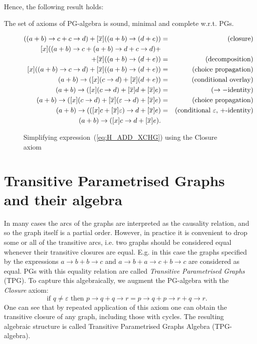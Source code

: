 Hence, the following result holds:
\begin{thm}
 The set of axioms of PG-algebra
is sound, minimal and complete w.r.t. PGs.
\end{thm}
\begin{figure}

\begin{eqnarray*}
[x]((a+b)\rightarrow c+c\rightarrow d)+[\overline{x}]((a+b)\rightarrow(d+e)) & = & (\textrm{closure)}\\
{}[x]((a+b)\rightarrow c+(a+b)\rightarrow d+c\rightarrow d)+\\+[\overline{x}]((a+b)\rightarrow(d+e)) & = & (\textrm{decomposition)}\\
{}[x]((a+b)\rightarrow c\rightarrow d)+[\overline{x}]((a+b)\rightarrow(d+e)) & = & (\textrm{choice propagation)}\\
(a+b)\rightarrow([x](c\rightarrow d)+[\overline{x}](d+e)) & = & (\textrm{conditional overlay)}\\
(a+b)\rightarrow([x](c\rightarrow d)+[\overline{x}]d+[\overline{x}]e) & = & (\rightarrow-\textrm{identity)}\\
(a+b)\rightarrow([x](c\rightarrow d)+[\overline{x}](\varepsilon\rightarrow d)+[\overline{x}]e) & = & (\textrm{choice propagation)}\\
(a+b)\rightarrow(([x]c+[\overline{x}]\varepsilon)\rightarrow d+[\overline{x}]e) & = & (\textrm{conditional \ensuremath{\varepsilon}, +-\textrm{identity)}}\\
(a+b)\rightarrow([x]c\rightarrow d+[\overline{x}]e).
\end{eqnarray*}


\caption{Simplifying expression~(\ref{eq:H_ADD_XCHG}) using the Closure axiom\label{fig:Simplifying-TPG-expressions}}
\end{figure}



\section{Transitive Parametrised Graphs and their algebra}

In many cases the arcs of the graphs are interpreted as the causality
relation, and so the graph itself is a partial order. However, in
practice it is convenient to drop some or all of the transitive arcs,
i.e. two graphs should be considered equal whenever their transitive
closures are equal. E.g. in this case the graphs specified by the
expressions $a\rightarrow b+b\rightarrow c$ and $a\rightarrow b+a\rightarrow c+b\rightarrow c$
are considered as equal. PGs with this equality relation are called
\emph{Transitive Parametrised Graphs} (TPG). To capture this algebraically,
we augment the PG-algebra with the \emph{Closure} axiom:
\[
\mbox{{if\ }}q\neq\varepsilon\mbox{{\ then\ }}p\!\rightarrow\! q+q\!\rightarrow\! r=p\!\rightarrow\! q+p\!\rightarrow\! r+q\!\rightarrow\! r.
\]
One can see that by repeated application of this axiom one can obtain
the transitive closure of any graph, including those with cycles.
The resulting algebraic structure is called Transitive Parametrised Graphs Algebra
(TPG-algebra).


